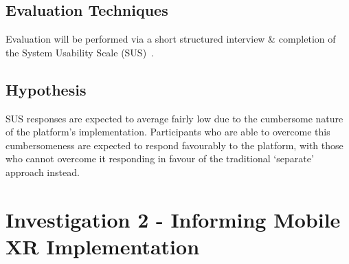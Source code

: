 \documentclass[oneside]{book}
\begin{document}

\section{Evaluation Techniques}
Evaluation will be performed via a short structured interview \& completion of the System Usability Scale (SUS)~\cite{Brooke1996}.


\section{Hypothesis}
SUS responses are expected to average fairly low due to the cumbersome nature of the platform's implementation. Participants who are able to overcome this cumbersomeness are expected to respond favourably to the platform, with those who cannot overcome it responding in favour of the traditional `separate' approach instead.


\chapter{Investigation 2 - Informing Mobile XR Implementation}
\end{document}
